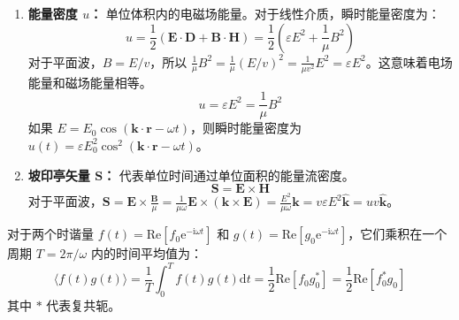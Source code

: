 \documentclass[fontset=none]{ctexart}
\begin{document}
\begin{definition}[电磁波的能量和能流]
\begin{enumerate}
    \item \textbf{能量密度 $u$：} 单位体积内的电磁场能量。对于线性介质，瞬时能量密度为：
    \begin{equation}
        u = \frac{1}{2}(\bm{E} \cdot \bm{D} + \bm{B} \cdot \bm{H}) = \frac{1}{2}(\varepsilon E^2 + \frac{1}{\mu} B^2)
    \end{equation}
    对于平面波，$B = E/v$，所以 $\frac{1}{\mu} B^2 = \frac{1}{\mu} (E/v)^2 = \frac{1}{\mu v^2} E^2 = \varepsilon E^2$。这意味着电场能量和磁场能量相等。
    \begin{equation}
        u = \varepsilon E^2 = \frac{1}{\mu} B^2
    \end{equation}
    如果 $E = E_0 \cos(\bm{k}\cdot\bm{r}-\omega t)$，则瞬时能量密度为 $u(t) = \varepsilon E_0^2 \cos^2(\bm{k}\cdot\bm{r}-\omega t)$。
    
    \item \textbf{坡印亭矢量 $\bm{S}$：} 代表单位时间通过单位面积的能量流密度。
    \begin{equation}
        \bm{S} = \bm{E} \times \bm{H}
    \end{equation}
    对于平面波，$\bm{S} = \bm{E} \times \frac{\bm{B}}{\mu} = \frac{1}{\mu\omega} \bm{E} \times (\bm{k} \times \bm{E}) = \frac{E^2}{\mu\omega} \bm{k} = v\varepsilon E^2 \hat{\bm{k}} = u v \hat{\bm{k}}$。
\end{enumerate}
\end{definition}

\begin{theorem}[时谐场的平均值]
对于两个时谐量 $f(t) = \mathrm{Re}[f_0 \mathrm{e}^{-\mathrm{i}\omega t}]$ 和 $g(t) = \mathrm{Re}[g_0 \mathrm{e}^{-\mathrm{i}\omega t}]$，它们乘积在一个周期 $T=2\pi/\omega$ 内的时间平均值为：
\begin{equation}
\langle f(t)g(t) \rangle = \frac{1}{T}\int_0^T f(t)g(t) \mathrm{d}t = \frac{1}{2}\mathrm{Re}[f_0 g_0^*] = \frac{1}{2}\mathrm{Re}[f_0^* g_0]
\end{equation}
其中 $*$ 代表复共轭。
\end{theorem}
\end{document}
